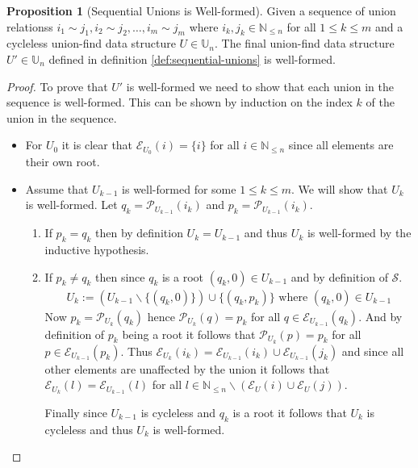 \documentclass[a4paper,12pt]{article}
\theoremstyle{definition}
\newtheorem{proposition}{Proposition}[section]
\begin{document}
\begin{proposition}[Sequential Unions is Well-formed]
    Given a sequence of union relationss $i_1 \sim j_1, i_2 \sim j_2, \ldots,
    i_m \sim j_m$ where $i_k, j_k \in \mathbb{N}_{\leq n}$ for all $1 \leq k
    \leq m$ and a cycleless union-find data structure $U \in \mathbb{U}_n$. The
    final union-find data structure $U' \in \mathbb{U}_n$ defined in definition
    \ref{def:sequential-unions} is well-formed.
\end{proposition}
\begin{proof}
    To prove that $U'$ is well-formed we need to show that each union in the
    sequence is well-formed. This can be shown by induction on the index $k$ of
    the union in the sequence.
    \begin{itemize}
        \item For $U_0$ it is clear that $\mathcal{E}_{U_0}(i) = \{i\}$ for all $i \in
        \mathbb{N}_{\leq n}$ since all elements are their own root.
        \item Assume that $U_{k-1}$ is well-formed for some $1 \leq k \leq m$.
        We will show that $U_k$ is well-formed. Let $q_k
        =\mathcal{P}_{U_{k-1}}(i_k)$ and $p_k = \mathcal{P}_{U_{k-1}}(i_k)$.
        \begin{enumerate}
            \item If $p_k = q_k$ then by definition $U_k = U_{k-1}$ and thus
            $U_k$ is well-formed by the inductive hypothesis.
            \item If $p_k \neq q_k$ then since $q_k$ is a root $(q_k, 0) \in U_{k - 1}$ and by definition
            of $\mathcal{S}$.
            \begin{align*}
                U_k := (U_{k-1} \backslash \{(q_k, 0)\}) \cup \{(q_k, p_k)\} \text{ where } (q_k, 0) \in U_{k-1}
            \end{align*}
            Now $p_k = \mathcal{P}_{U_k}(q_k)$ hence $\mathcal{P}_{U_k}(q) = p_k$ for all $q
            \in \mathcal{E}_{U_{k - 1}}(q_k)$. And by definition of $p_k$ being
            a root it follows that $\mathcal{P}_{U_k}(p) = p_k$ for all $p \in
            \mathcal{E}_{U_{k - 1}}(p_k)$. Thus $\mathcal{E}_{U_k}(i_k) =
            \mathcal{E}_{U_{k - 1}}(i_k) \cup \mathcal{E}_{U_{k - 1}}(j_k)$ and
            since all other elements are unaffected by the union it follows that
            $\mathcal{E}_{U_k}(l) = \mathcal{E}_{U_{k - 1}}(l)$ for all $l \in
            \mathbb{N}_{\leq n} \backslash (\mathcal{E}_U(i) \cup
            \mathcal{E}_U(j))$.

            Finally since $U_{k-1}$ is cycleless and $q_k$ is a root it follows
            that $U_k$ is cycleless and thus $U_k$ is well-formed.
        \end{enumerate}
    \end{itemize}
\end{proof}
\end{document}
